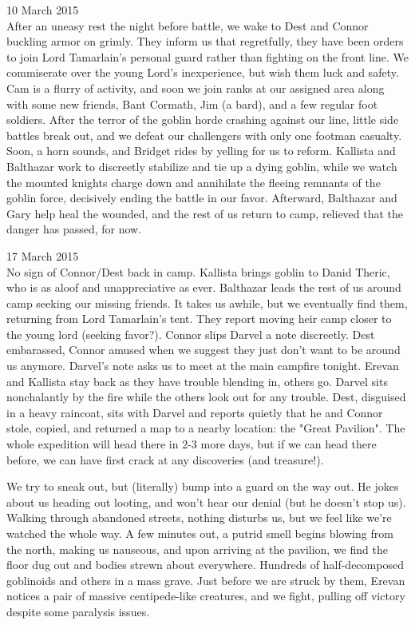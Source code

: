 \documentclass[letterpaper]{article}
\begin{document}
10 March 2015\\
After an uneasy rest the night before battle, we wake to Dest and Connor buckling armor on grimly. They inform us that regretfully, they have been orders to join Lord Tamarlain's personal guard rather than fighting on the front line. We commiserate over the young Lord's inexperience, but wish them luck and safety.  Cam is a flurry of activity, and soon we join ranks at our assigned area along with some new friends, Bant Cormath, Jim (a bard), and a few regular foot soldiers. After the terror of the goblin horde crashing against our line, little side battles break out, and we defeat our challengers with only one footman casualty. Soon, a horn sounds, and Bridget rides by yelling for us to reform. Kallista and Balthazar work to discreetly stabilize and tie up a dying goblin, while we watch the mounted knights charge down and annihilate the fleeing remnants of the goblin force, decisively ending the battle in our favor. Afterward, Balthazar and Gary help heal the wounded, and the rest of us return to camp, relieved that the danger has passed, for now.

17 March 2015\\
No sign of Connor/Dest back in camp. Kallista brings goblin to Danid Theric, who is as aloof and unappreciative as ever. Balthazar leads the rest of us around camp seeking our missing friends. It takes us awhile, but we eventually find them, returning from Lord Tamarlain's tent. They report moving heir camp closer to the young lord (seeking favor?). Connor slips Darvel a note discreetly. Dest embarassed, Connor amused when we suggest they just don't want to be around us anymore. Darvel's note asks us to meet at the main campfire tonight. Erevan and Kallista stay back as they have trouble blending in, others go. Darvel sits nonchalantly by the fire while the others look out for any trouble. Dest, disguised in a heavy raincoat, sits with Darvel and reports quietly that he and Connor stole, copied, and returned a map to a nearby location: the "Great Pavilion". The whole expedition will head there in 2-3 more days, but if we can head there before, we can have first crack at any discoveries (and treasure!). 

We try to sneak out, but (literally) bump into a guard on the way out. He jokes about us heading out looting, and won't hear our denial (but he doesn't stop us). Walking through abandoned streets, nothing disturbs us, but we feel like we're watched the whole way. A few minutes out, a putrid smell begins blowing from the north, making us nauseous, and upon arriving at the pavilion, we find the floor dug out and bodies strewn about everywhere. Hundreds of half-decomposed goblinoids and others in a mass grave. Just before we are struck by them, Erevan notices a pair of massive centipede-like creatures, and we fight, pulling off victory despite some paralysis issues.
\end{document}
